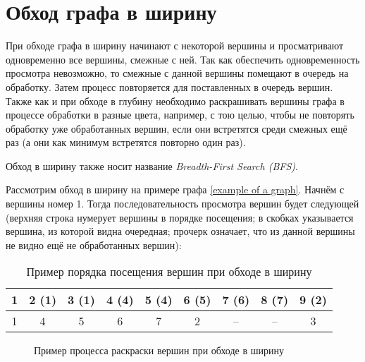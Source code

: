 \section{Обход графа в ширину}

При обходе графа в ширину начинают с некоторой вершины и просматривают 
одновременно все вершины, смежные с ней. Так как обеспечить одновременность 
просмотра невозможно, то смежные с данной вершины помещают в очередь на 
обработку. Затем процесс повторяется для поставленных в очередь вершин.
Также как и при обходе в глубину необходимо раскрашивать вершины графа в 
процессе обработки в разные цвета, например, с тою целью, чтобы не повторять 
обработку уже обработанных вершин, если они встретятся среди смежных ещё раз (а 
они как минимум встретятся повторно один раз).

Обход в ширину также носит название \emph{Breadth-First Search (BFS)}.

Рассмотрим обход в ширину на примере графа \ref{example of a graph}. Начнём с 
вершины номер 1. Тогда последовательность просмотра вершин будет следующей 
(верхняя строка нумерует вершины в порядке посещения; в скобках указывается 
вершина, из которой видна очередная; прочерк означает, что из данной вершины не 
видно ещё не обработанных вершин):

\begin{table}[h]
	\center
	\begin{tabular}{|c|c|c|c|c|c|c|c|c|}
		\hline
		1 & 2 (1) & 3 (1) & 4 (4) & 5 (4) & 6 (5) & 7 (6) & 8 (7) & 9 (2)\\
		\hline
		1 & 4 & 5 & 6 & 7 & 2 & – & – & 3\\
		\hline
	\end{tabular}
	\caption{Пример порядка посещения вершин при обходе в ширину}
\end{table}

\begin{figure}[h]
	\center
	\caption{Пример процесса раскраски вершин при обходе в ширину}
	\label{picture: process coloring of the vertices in the BFS}
\end{figure}

